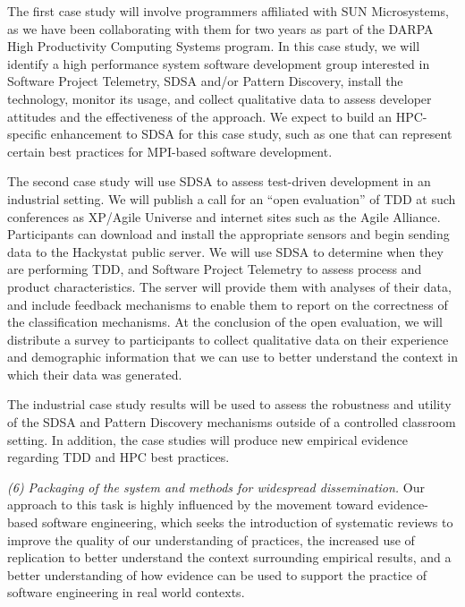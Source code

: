 The first case study will involve programmers affiliated with SUN
Microsystems, as we have been collaborating with them for two years as part
of the DARPA High Productivity Computing Systems program. In this case
study, we will identify a high performance system software development
group interested in Software Project Telemetry, SDSA and/or Pattern
Discovery, install the technology, monitor its usage, and collect
qualitative data to assess developer attitudes and the effectiveness of the
approach.  We expect to build an HPC-specific enhancement to SDSA for this
case study, such as one that can represent certain best practices for
MPI-based software development.

The second case study will use SDSA to assess test-driven development in an
industrial setting.  We will publish a call for an ``open evaluation'' of
TDD at such conferences as XP/Agile Universe and internet sites such as the
Agile Alliance.  Participants can download and install the appropriate
sensors and begin sending data to the Hackystat public server.  We will use
SDSA to determine when they are performing TDD, and Software Project
Telemetry to assess process and product characteristics. The server will
provide them with analyses of their data, and include feedback mechanisms
to enable them to report on the correctness of the classification
mechanisms.  At the conclusion of the open evaluation, we will distribute a
survey to participants to collect qualitative data on their experience and
demographic information that we can use to better understand the context in
which their data was generated.

The industrial case study results will be used to assess the robustness and
utility of the SDSA and Pattern Discovery mechanisms outside of a
controlled classroom setting. In addition, the case studies will produce
new empirical evidence regarding TDD and HPC best practices.

{\em (6) Packaging of the system and methods for widespread dissemination.} 
Our approach to this task is highly influenced by the movement toward
evidence-based software engineering, which seeks the introduction of
systematic reviews to improve the quality of our understanding of
practices, the increased use of replication to better understand the
context surrounding empirical results, and a better understanding of how 
evidence can be used to support the practice of software engineering in 
real world contexts.   

